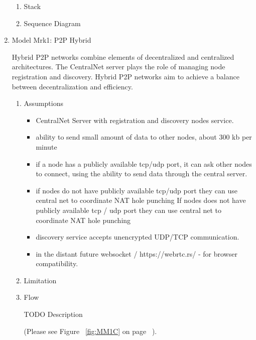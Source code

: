\begin{enumerate}
\begin{enumerate}
\item Stack

\item Sequence Diagram

\end{enumerate}

\item Model Mrk1: P2P Hybrid

Hybrid P2P networks combine elements of decentralized and centralized architectures.
The CentralNet server plays the role of managing node registration and discovery.
Hybrid P2P networks aim to achieve a balance between decentralization and efficiency.

\begin{enumerate}

\item Assumptions

\begin{itemize}

\item CentralNet Server with registration and discovery nodes service.

\item ability to send small amount of data to other nodes, about 300 kb per minute

\item if a node has a publicly available tcp/udp port, it can ask other nodes to connect,
using the ability to send data through the central server.

\item if nodes do not have publicly available tcp/udp port they can use central net to coordinate NAT hole punching
If nodes does not have publicly available tcp / udp port they can use central net to coordinate NAT hole punching

\item discovery service accepts unencrypted UDP/TCP communication.

\item in the distant future websocket / https://webrtc.rs/ - for browser compatibility.

\end{itemize} 

\item Limitation 

\item Flow

TODO Description

(Please see Figure ~\ref{fig:MM1C} on page ~\pageref{fig:MM1C}).


\end{enumerate}
\end{enumerate}
